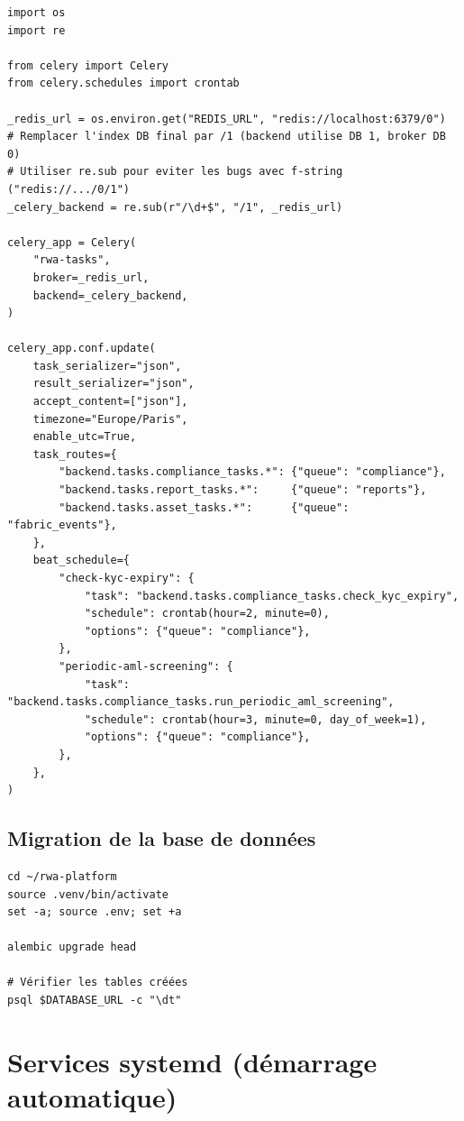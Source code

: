 \documentclass[12pt,a4paper,french]{article}
\begin{document}
\begin{lstlisting}[style=python, caption={backend/tasks/celery\_app.py}]
import os
import re

from celery import Celery
from celery.schedules import crontab

_redis_url = os.environ.get("REDIS_URL", "redis://localhost:6379/0")
# Remplacer l'index DB final par /1 (backend utilise DB 1, broker DB 0)
# Utiliser re.sub pour eviter les bugs avec f-string ("redis://.../0/1")
_celery_backend = re.sub(r"/\d+$", "/1", _redis_url)

celery_app = Celery(
    "rwa-tasks",
    broker=_redis_url,
    backend=_celery_backend,
)

celery_app.conf.update(
    task_serializer="json",
    result_serializer="json",
    accept_content=["json"],
    timezone="Europe/Paris",
    enable_utc=True,
    task_routes={
        "backend.tasks.compliance_tasks.*": {"queue": "compliance"},
        "backend.tasks.report_tasks.*":     {"queue": "reports"},
        "backend.tasks.asset_tasks.*":      {"queue": "fabric_events"},
    },
    beat_schedule={
        "check-kyc-expiry": {
            "task": "backend.tasks.compliance_tasks.check_kyc_expiry",
            "schedule": crontab(hour=2, minute=0),
            "options": {"queue": "compliance"},
        },
        "periodic-aml-screening": {
            "task": "backend.tasks.compliance_tasks.run_periodic_aml_screening",
            "schedule": crontab(hour=3, minute=0, day_of_week=1),
            "options": {"queue": "compliance"},
        },
    },
)
\end{lstlisting}

\subsection{Migration de la base de données}

\begin{lstlisting}[style=bash, caption={Appliquer les migrations Alembic}]
cd ~/rwa-platform
source .venv/bin/activate
set -a; source .env; set +a

alembic upgrade head

# Vérifier les tables créées
psql $DATABASE_URL -c "\dt"
\end{lstlisting}

\section{Services systemd (démarrage automatique)}
\end{document}
